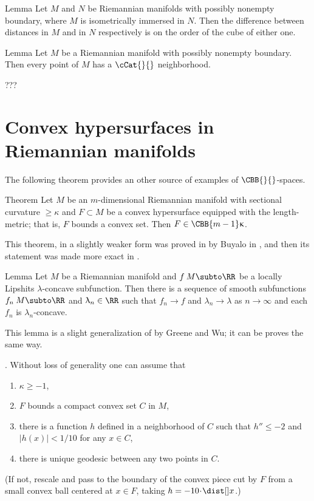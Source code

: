 \begin{thm}{Lemma}\label{lem:mnflds-with-bry:CBA}
Let $M$ and $N$ be  Riemannian manifolds with possibly nonempty boundary, where $M$ is isometrically immersed in $N$.  Then the difference between distances in $M$ and in $N$ respectively is on the order of the cube of either one.
\end{thm}
%
\begin{thm}{Lemma}\label{lem:mnflds-with-bry:CBA}
Let $M$ be a Riemannian manifold with possibly nonempty boundary.
Then every point of $M$ has a $\cCat{}{}$ neighborhood.
\end{thm}

???
\qeds



\section{Convex hypersurfaces in Riemannian manifolds}

The following theorem provides an other source of examples of $\CBB{}{}$-spaces.

\begin{thm}{Theorem}\label{thm:buyalo} 
Let $M$ be an $m$-dimensional Riemannian manifold 
with sectional curvature $\ge \kappa$ 
and $F\subset M$ be a convex hypersurface equipped with the length-metric;
that is, $F$ bounds a convex set. 
Then $F\in\CBB{m-1}\kappa$.
\end{thm}

This theorem, in a slightly weaker form was proved in by Buyalo in \cite{buyalo:convex-surface}, 
and then its statement was made more exact in \cite{akp}.

\begin{thm}{Lemma}\label{lem:smoothing}
Let $M$ be a Riemannian manifold and $f\:M\subto\RR$ be a locally Lipshits $\lambda$-concave subfunction. 
Then there is a sequence of smooth subfunctions $f_n\:M\subto\RR$ and $\lambda_n\in\RR$ such that $f_n\to f$ and $\lambda_n\to \lambda$ as $n\to\infty$ and each $f_n$ is $\lambda_n$-concave.
\end{thm} 

This lemma is a slight generalization of \cite[Theorem 2]{greene-wu}
by Greene and Wu;
it can be proves the same way.

. 
Without loss of generality one can assume that 
\begin{enumerate}
\item \label{k>=-1}$\kappa\ge -1$, 
\item $F$ bounds a compact convex set $C$ in $M$, 
\item there is a function $h$ defined in a neighborhood of $C$ such that $h''\le -2$ and $|h(x)|<1/10$ for any $x\in C$,
\item \label{property:unique} there is unique geodesic between any two points in $C$. 
\end{enumerate}
(If not, rescale and pass to the boundary of the convex piece cut by $F$  from a small convex ball centered at $x\in F$, taking $h=-10\cdot\dist[{{}}]{x}{}{}$.)

